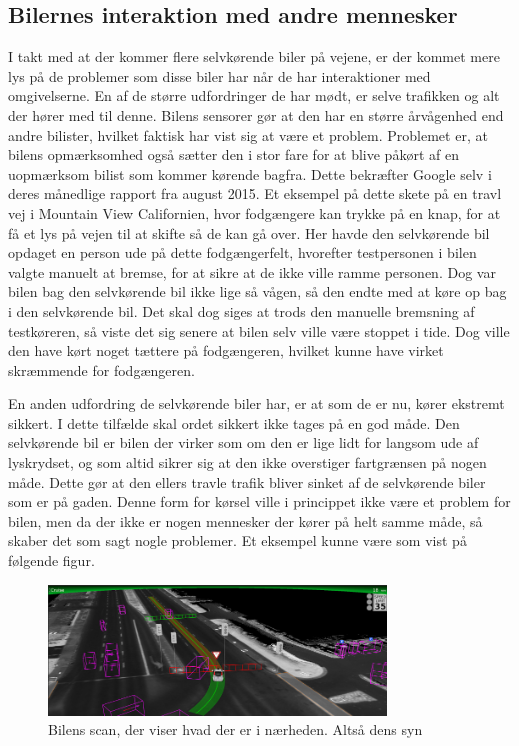 \subsection{Bilernes interaktion med andre mennesker}
I takt med at der kommer flere  selvkørende biler på vejene, er der kommet mere lys på de problemer som disse biler har når de har interaktioner med omgivelserne. En af de større udfordringer de har mødt, er selve trafikken og alt der hører med til denne. Bilens sensorer gør at den har en større årvågenhed end andre bilister, hvilket faktisk har vist sig at være et problem. Problemet er, at bilens opmærksomhed også sætter den i stor fare for at blive påkørt af en uopmærksom bilist som kommer kørende bagfra. Dette bekræfter Google selv i deres månedlige rapport fra august 2015\cite{GOOG_MONTHLY}. Et eksempel på dette skete på en travl vej i Mountain View Californien, hvor fodgængere kan trykke på en knap, for at få et lys på vejen til at skifte så de kan gå over. Her havde den selvkørende bil opdaget en person ude på dette fodgængerfelt, hvorefter testpersonen i bilen valgte  manuelt at bremse, for at sikre at de ikke ville ramme personen. Dog var bilen bag den selvkørende bil ikke lige så vågen, så den endte med at køre op bag i  den selvkørende bil. Det skal dog siges at trods den manuelle bremsning af testkøreren, så viste det sig senere at bilen selv ville være stoppet i tide. Dog ville den have kørt noget tættere på fodgængeren, hvilket kunne have virket skræmmende for fodgængeren\cite{GOOG_MONTHLY}. 

En anden udfordring de selvkørende biler har, er at som de er nu, kører ekstremt sikkert. I dette tilfælde skal ordet sikkert ikke tages på en god måde. Den selvkørende bil er bilen der virker som om den er lige lidt for langsom ude af lyskrydset, og som altid sikrer sig at den ikke overstiger fartgrænsen på nogen måde. Dette gør at den ellers travle trafik bliver sinket af de selvkørende biler som er på gaden. Denne form for kørsel ville i princippet ikke være et problem for bilen, men da der ikke er nogen mennesker der kører på helt samme måde, så skaber det som sagt nogle problemer. Et eksempel kunne være som vist på følgende figur.

\begin{figure}[h!]
    \centering
    \includegraphics[width=0.8\textwidth]{images/google_vision.png}
    \caption{Bilens scan, der viser hvad der er i nærheden. Altså dens syn}
    \label{fig:car_vision}
\end{figure}

